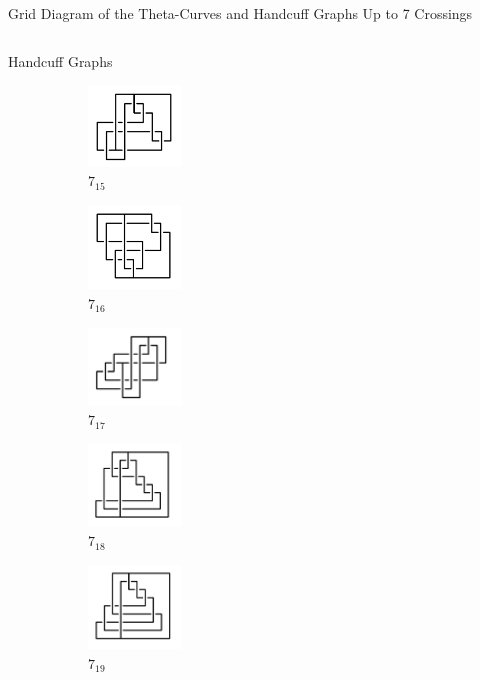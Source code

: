 \documentclass[final]{beamer}
\begin{document}
\begin{frame}[t]
\begin{alertblock}{Grid Diagram of the Theta-Curves and Handcuff Graphs Up to 7 Crossings}
\begin{columns}[t]
\begin{column}{0.3\textwidth}
\begin{alertblock}{Handcuff Graphs}
\begin{figure}
    \begin{subfigure}{0.15\textwidth}
    \includegraphics[width=2.5cm]{../Midterm_Poster/grid_diagram/handcuff_7_15.png}
    \caption{$7_{15}$} 
    \end{subfigure}
    \begin{subfigure}{0.15\textwidth}
    \includegraphics[width=2.5cm]{../Midterm_Poster/grid_diagram/handcuff_7_16.png}
    \caption{$7_{16}$} 
    \end{subfigure}
    \begin{subfigure}{0.15\textwidth}
    \includegraphics[width=2.5cm]{../Midterm_Poster/grid_diagram/handcuff_7_17.png}
    \caption{$7_{17}$} 
    \end{subfigure}
    \begin{subfigure}{0.15\textwidth}
    \includegraphics[width=2.5cm]{../Midterm_Poster/grid_diagram/handcuff_7_18.png}
    \caption{$7_{18}$} 
    \end{subfigure}
    \begin{subfigure}{0.15\textwidth}
    \includegraphics[width=2.5cm]{../Midterm_Poster/grid_diagram/handcuff_7_19.png}
    \caption{$7_{19}$} 
    \end{subfigure}
    \begin{subfigure}{0.15\textwidth}

\end{subfigure}
\end{figure}
\end{alertblock}
\end{column}
\end{columns}
\end{alertblock}
\end{frame}
\end{document}

